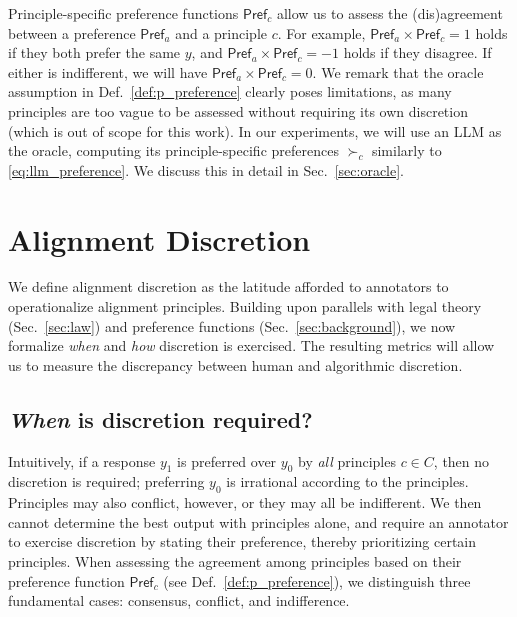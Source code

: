 \documentclass{article}
\newcommand{\pref}{\textsf{Pref}}
\begin{document}
Principle-specific preference functions $\pref_c$ allow us to assess the (dis)agreement between a preference $\pref_a$ and a principle $c$. For example, $\pref_a \times \pref_c = 1$ holds if they both prefer the same $y$, and $\pref_a \times \pref_c = -1$ holds if they disagree. If either is indifferent, we will have $\pref_a \times \pref_c = 0$. We remark that the oracle assumption in Def.~\ref{def:p_preference} clearly poses limitations, as many principles are too vague to be assessed without requiring its own discretion (which is out of scope for this work). In our experiments, we will use an LLM as the oracle, computing its principle-specific preferences $\succ_c$ similarly to \eqref{eq:llm_preference}. We discuss this in detail in Sec.~\ref{sec:oracle}.



\section{Alignment Discretion}\label{sec:method}
We define alignment discretion as the latitude afforded to annotators to operationalize alignment principles. Building upon parallels with legal theory (Sec.~\ref{sec:law}) and preference functions (Sec.~\ref{sec:background}), we now formalize \textit{when} and \textit{how} discretion is exercised. The resulting metrics will allow us to measure the discrepancy between human and algorithmic discretion. 






\subsection{\textit{When} is discretion required?}\label{sec:when_discretion}
Intuitively, if a response $y_1$ is preferred over $y_0$ by \textit{all} principles $c \in C$, then no discretion is required; preferring $y_0$ is irrational according to the principles.
Principles may also conflict, however, or they may all be indifferent. We then cannot determine the best output with principles alone, and require an annotator to exercise discretion by stating their preference, thereby prioritizing certain principles. When assessing the agreement among principles based on their preference function $\pref_c$ (see Def.~\ref{def:p_preference}), we distinguish three fundamental cases: consensus, conflict, and indifference.
\end{document}
